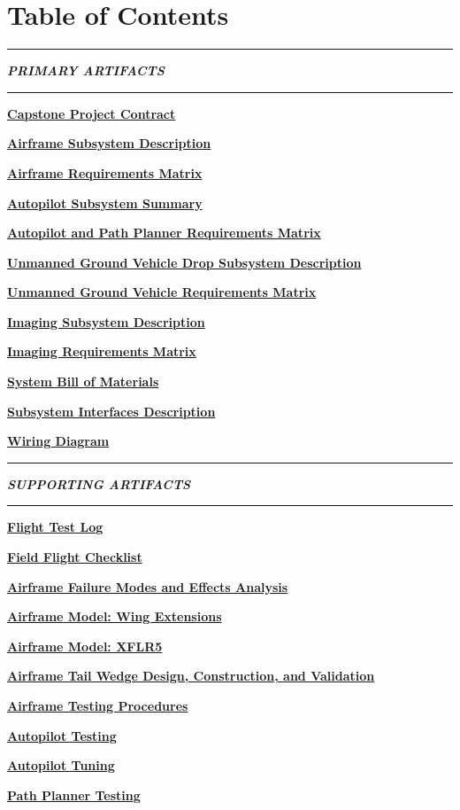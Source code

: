 \documentclass[]{article}
\newcommand{\pdflink}[2]{
\hyperlink{#1.1}{\textbf{#2}}
}
\begin{document}



\section*{Table of Contents}

\hrule

\textbf{\textit{PRIMARY ARTIFACTS}}

\hrule

\pdflink{proj_cont}{Capstone Project Contract}

\pdflink{add}{Airframe Subsystem Description}

\pdflink{arq}{Airframe Requirements Matrix}

\pdflink{auto}{Autopilot Subsystem Summary}

\pdflink{autorq}{Autopilot and Path Planner Requirements Matrix}

\pdflink{ugvdsscd}{Unmanned Ground Vehicle Drop Subsystem Description}

\pdflink{ugvrm}{Unmanned Ground Vehicle Requirements Matrix}

\pdflink{isd}{Imaging Subsystem Description}

\pdflink{irm}{Imaging Requirements Matrix}

\pdflink{abm}{System Bill of Materials}

\pdflink{sid}{Subsystem Interfaces Description}

\pdflink{wd}{Wiring Diagram}

\hrule

\textbf{\textit{SUPPORTING ARTIFACTS}}

\hrule

\pdflink{fl}{Flight Test Log}

\pdflink{ffcl}{Field Flight Checklist}

\pdflink{afmea}{Airframe Failure Modes and Effects Analysis}

\pdflink{amwe}{Airframe Model: Wing Extensions}

\pdflink{amxflr}{Airframe Model: XFLR5}

\pdflink{atwt}{Airframe Tail Wedge Design, Construction, and Validation}

\pdflink{atap}{Airframe Testing Procedures}

\pdflink{atest}{Autopilot Testing}

\pdflink{atune}{Autopilot Tuning}

\pdflink{ppt}{Path Planner Testing}
\end{document}
